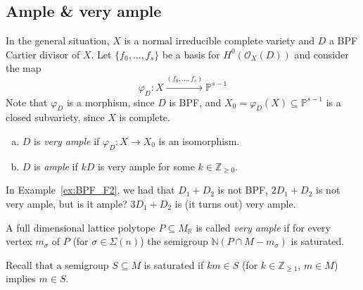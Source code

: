 \documentclass[a4paper,12pt]{amsart}
\newcommand{\ZZ}{\mathbb{Z}}
\newcommand{\RR}{\mathbb{R}}
\newcommand{\PP}{\mathbb{P}}
\newcommand{\NN}{\mathbb{N}}
\begin{document}
\subsection{Ample \& very ample}

In the general situation, $X$ is a normal irreducible complete variety and $D$ a BPF Cartier divisor of $X$. Let $\{f_0,\dots,f_s\}$ be a basis for $H^0(\mathcal{O}_X(D))$ and consider the map
$$
\varphi_D : X \xrightarrow{(f_0,\dots,f_s)} \PP^{s-1}
$$
Note that $\varphi_D$ is a morphism, since $D$ is BPF, and $X_0 = \varphi_D(X) \subseteq \PP^{s-1}$ is a closed subvariety, since $X$ is complete.
\begin{enumerate}[(a)]
\item $D$ is \emph{very ample} if $\varphi_D : X \longrightarrow X_0$ is an isomorphism.
\item $D$ is \emph{ample} if $kD$ is very ample for some $k \in \ZZ_{\geq 0}$. 
\end{enumerate}

In Example~\ref{ex:BPF_F2}, we had that $D_1+D_2$ is not BPF, $2D_1+D_2$ is not very ample, but is it ample? $3D_1+D_2$ is (it turns out) very ample.

\begin{definition}
A full dimensional lattice polytope $P \subseteq M_\RR$ is called \emph{very ample} if for every vertex $m_\sigma$ of $P$ (for $\sigma \in \Sigma(n)$) the semigroup $\NN(P\cap M - m_\sigma)$ is saturated.
\end{definition}

Recall that a semigroup $S \subseteq M$ is saturated if $km \in S$ (for $k \in \ZZ_{\geq 1}$, $m \in M$) implies $m \in S$.
\end{document}
